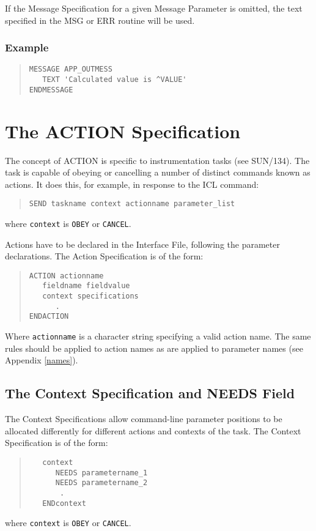 \documentclass[twoside,11pt]{article}
\newcommand{\xref}[3]{#1}
\newcommand{\xlabel}[1]{}
\renewcommand{\_}{\texttt{\symbol{95}}}
\begin{document}
If the Message Specification for a given Message Parameter is omitted, the
text specified in the MSG or ERR routine will be used.

\subsubsection*{Example}
\begin{quote} \begin{verbatim}
MESSAGE APP_OUTMESS
   TEXT 'Calculated value is ^VALUE'
ENDMESSAGE
\end{verbatim} \end{quote}

\section{The ACTION Specification\xlabel{the_action_specification}
\label{action}}

The concept of ACTION is specific to instrumentation tasks (see
\xref{SUN/134}{sun134}{}).
The task is capable of obeying or cancelling a number of distinct commands
known as actions.
It does this, for example, in response to the ICL command:
\begin{quote} \begin{verbatim}
SEND taskname context actionname parameter_list
\end{verbatim} \end{quote}
where \texttt{context} is \texttt{OBEY} or \texttt{CANCEL}.

Actions have to be declared in the Interface File, following the parameter
declarations. The Action Specification is of the form: 
\begin{quote} \begin{verbatim}
ACTION actionname
   fieldname fieldvalue
   context specifications
      .
ENDACTION
\end{verbatim} \end{quote}
Where \texttt{actionname} is a character string specifying a valid action name.
The same rules should be applied to action names as are applied to parameter
names (see Appendix \ref{names}).

\subsection{The Context Specification and NEEDS Field
\xlabel{the_context_specification_and_needs_field}\label{needs}}

The Context Specifications allow command-line parameter positions to be 
allocated differently for different actions and contexts of the task.
The Context Specification is of the form:
\begin{quote} \begin{verbatim}
   context
      NEEDS parametername_1
      NEEDS parametername_2
       .
   ENDcontext
\end{verbatim} \end{quote}
where \texttt{context} is \texttt{OBEY} or \texttt{CANCEL}.
\end{document}
